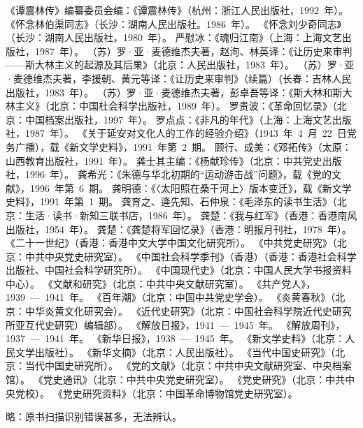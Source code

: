 \begin{thebibliography}{999}
\bibitem{}《谭震林传》编纂委员会编：《谭震林传》（杭州：浙江人民出版社，1992~年）。
\bibitem{}《怀念林伯渠同志》（长沙：湖南人民出版社。1986~年）。
\bibitem{}《怀念刘少奇同志》（长沙：湖南人民出版社，1980~年）。
\bibitem{}严慰冰：《魂归江南》（上海：上海文艺出版社，1987~年）。
\bibitem{}（苏）罗·亚·麦德维杰夫著，赵洵、林英译：《让历史来审判——斯大林主义的起源及其后果》（北京：人民出版社，1983~年）。
\bibitem{}（苏）罗·亚·麦德维杰夫著，李援朝、黄元等译：《让历史来审判》（续篇）（长春：吉林人民出版社，1983~年）。
\bibitem{}（苏）罗·亚·麦德维杰夫著，彭卓吾等译：《斯大林和斯大林主义》（北京：中国杜会科学出版社，1989~年）。
\bibitem{}罗贵波：《革命回忆录》（北京：中国档案出版社，1997~年）。
\bibitem{}罗点点：《非凡的年代》（上海：上海文艺出版社，1987~年）。
\bibitem{}《关于延安对文化人的工作的经验介绍》（1943~年~4~月~22~日党务广播），载《新文学史料》，1991~年第~2~期。
\bibitem{}顾行、成美：《邓拓传》（太原：山西教育出版社，1991~年）。
\bibitem{}龚士其主编：《杨献珍传》（北京：中共党史出版社，1996~年）。
\bibitem{}龚希光：《朱德与华北初期的“运动游击战”问题》，载《党的文献》，1996~年第~6~期。
\bibitem{}龚明德：《〈太阳照在桑干河上〉版本变迁》，载《新文学史料》，1991~年第~1~期。
\bibitem{}龚育之、逄先知、石仲泉：《毛泽东的读书生活》（北京：生活·读书·新知三联书店，1986~年）。
\bibitem{}龚楚：《我与红军》（香港：香港南风出版社，1954~年）。
\bibitem{}龚楚：《龚楚将军回忆录》（香港：明报月刊社，1978~年）。
\bibitem{}《二十一世纪》（香港：香港中文大学中国文化研究所）。
\bibitem{}《中共党史研究》（北京：中共中央党史研究室）。
\bibitem{}《中国社会科学季刊》（香港）（香港：香港社会科学出版社、中国社会科学研究所）。
\bibitem{}《中国现代史》（北京：中国人民大学书报资料中心）。
\bibitem{}《文献和研究》（北京：中共中央文献研究室）。
\bibitem{}《共产党人》，1939~—~1941~年。
\bibitem{}《百年潮》（北京：中国中共党史学会）。
\bibitem{}《炎黄春秋》（北京：中华炎黄文化研究会）。
\bibitem{}《近代史研究》（北京：中国社会科学院近代史研究所亚互代史研究）编辑部）。
\bibitem{}《解放日报》，1941~—~1945~年。
\bibitem{}《解放周刊》，1937~—~1941~年。
\bibitem{}《新华日报》，1938~—~1945~年。
\bibitem{}《新文学史料》（北京：人民文学出版社）。
\bibitem{}《新华文摘》（北京：人民出版社）。
\bibitem{}《当代中国史研究》（北京：当代中国史研究所）。
\bibitem{}《党的文献》（北京：中共中央文献研究室、中央档案馆）。
\bibitem{}《党史通讯》（北京：中共中央党史研究室）。
\bibitem{}《党史研究》（北京：中共中央党校）。
\bibitem{}《党史研究资料》（北京：中国革命博物馆党史研究室）。
\item[]\kaishu 略：原书扫描识别错误甚多，无法辨认。
\end{thebibliography}
